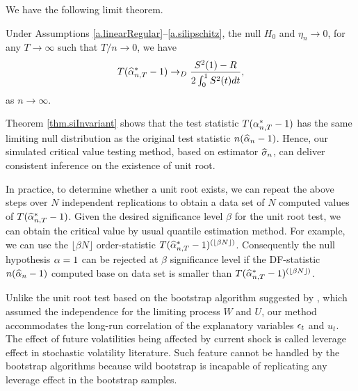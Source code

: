 We have the following limit theorem.
\begin{thm} 
Under  Assumptions \ref{a.linearRegular}--\ref{a.silipschitz}, the null $H_0$ and $\eta_n\to 0$, for any $T\to\infty$ such that $T/ n \to 0$, we have
\begin{equation} \la{thm.siInvariant.eqn1}
T( \widehat{\al}^*_{n,T} - 1) \rightarrow_D \frac{S^2(1) - R}
{ 2 \int_{0}^{1} S^2(t) dt },
\end{equation}
as $n \to \infty$.
\end{thm}


\begin{rem}
Theorem \ref{thm.siInvariant} shows that the test statistic $T (\alpha_{n,T}^* - 1)$ has the same limiting null distribution as the original test statistic $n (\widehat{\alpha}_n - 1)$. Hence, our simulated critical value testing method, based on estimator $\widehat{\sigma}_n$, can deliver consistent inference on the existence of unit root.
\end{rem}

\begin{rem} 
In practice, to determine whether a unit root exists, we can repeat the above steps over $N$ independent replications to obtain a data set of $N$ computed values of $T( \widehat{\alpha}^*_{n,T} - 1)$. Given the desired significance level $\beta$ for the unit root test, we can obtain the critical value by usual quantile estimation method. For example, we can use the $\lfloor \beta N \rfloor $ order-statistic $T( \widehat{\alpha}^*_{n,T} - 1)^{(\lfloor \beta N\rfloor)}$. Consequently the null hypothesis $\alpha=1$ can be rejected at $\beta$ significance level if the DF-statistic $n (\widehat{\alpha}_n - 1)$ computed base on data set is smaller than $T( \widehat{\alpha}^*_{n,T} - 1)^{(\lfloor \beta N\rfloor)}$.
\end{rem}

\begin{rem}
Unlike the unit root test based on the bootstrap algorithm suggested by \cite{cavalieretaylor2009}, which assumed the independence for the limiting process $W$ and $ U$, our method accommodates the long-run correlation of the explanatory variables $\epsilon_t$ and $u_t$. The effect of future volatilities being affected by current shock is called leverage effect in stochastic volatility literature. Such feature cannot be handled by the bootstrap algorithms because wild bootstrap is incapable of replicating any leverage effect in the bootstrap samples.
\end{rem}

